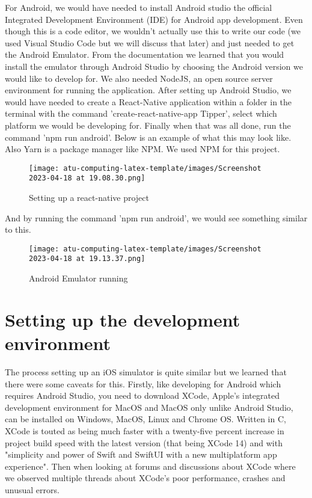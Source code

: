 For Android, we would have needed to install Android studio\cite{meetAndroidStudio} the official Integrated Development Environment (IDE) for Android app development. Even though this is a code editor, we wouldn't actually use this to write our code (we used Visual Studio Code but we will discuss that later) and just needed to get the Android Emulator. From the documentation we learned that you would install the emulator through Android Studio by choosing the Android version we would like to develop for\cite{installAndroidStudio}. We also needed NodeJS, an open source server environment for running the application. After setting up Android Studio, we would have needed to create a React-Native application within a folder in the terminal with the command 'create-react-native-app Tipper', select which platform we would be developing for. Finally when that was all done, run the command 'npm run android'. Below is an example of what this may look like. Also Yarn is a package manager like NPM. We used NPM for this project.
\begin{figure}[h]
  \centering
  \texttt{[image: atu-computing-latex-template/images/Screenshot 2023-04-18 at 19.08.30.png]}
  \caption{Setting up a react-native project}
  \label{fig:{Setting up a react-native project}}
\end{figure}
And by running the command 'npm run android', we would see something similar to this. 
\begin{figure}[h]
  \centering
  \texttt{[image: atu-computing-latex-template/images/Screenshot 2023-04-18 at 19.13.37.png]}
  \caption{Android Emulator running}
  \label{fig:{Android Emulator running}}
\end{figure}
\section{Setting up the development environment}
The process setting up an iOS simulator is quite similar but we learned that there were some caveats for this. Firstly, like developing for Android which requires Android Studio, you need to download XCode, Apple's integrated development environment for MacOS and MacOS only unlike Android Studio, can be installed on Windows, MacOS, Linux and Chrome OS. Written in C, XCode is touted as being much faster with a twenty-five percent increase in project build speed with the latest version (that being XCode 14)\cite{XCode} and with "simplicity and power of Swift and SwiftUI with a new multiplatform app experience". Then when looking at forums and discussions about XCode where we observed multiple threads about XCode's poor performance, crashes and unusual errors. 

